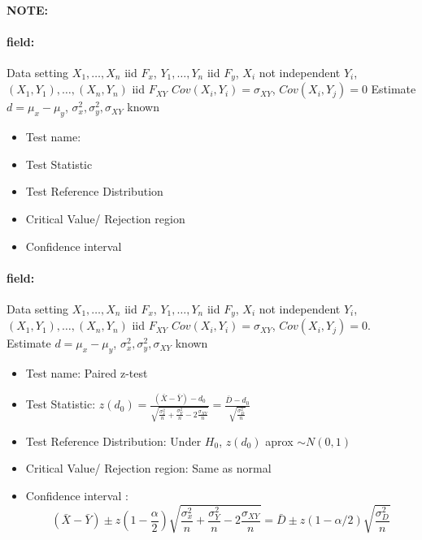 \documentclass[12pt]{article}
\newenvironment{note}{\paragraph{NOTE:}}{}
\newenvironment{field}{\paragraph{field:}}{}
\begin{document}
\begin{note}
 \begin{field}
  Data setting $X_1, \ldots , X_n$ iid $F_x$, $Y_1, \ldots, Y_n$ iid $F_y$, $X_i$ not independent $Y_i$, $(X_1, Y_1), \ldots , (X_n,Y_n)$ iid $F_{XY}$ $Cov(X_i,Y_i) = \sigma_{XY}$, $Cov(X_i,Y_j) = 0$ Estimate $d = \mu_x - \mu_y$, $\sigma_x^2, \sigma_y^2, \sigma_{XY}$ known
  \begin{itemize}
   \item Test name:
   \item Test Statistic
   \item Test Reference Distribution
   \item Critical Value/ Rejection region
   \item Confidence interval
  \end{itemize}
 \end{field}
 \begin{field}
  Data setting $X_1, \ldots , X_n$ iid $F_x$, $Y_1, \ldots, Y_n$ iid $F_y$, $X_i$ not independent $Y_i$, $(X_1, Y_1), \ldots , (X_n,Y_n)$ iid $F_{XY}$ $Cov(X_i,Y_i) = \sigma_{XY}$, $Cov(X_i,Y_j) = 0$. Estimate $d = \mu_x - \mu_y$, $\sigma_x^2, \sigma_y^2, \sigma_{XY}$ known
  \begin{itemize}
   \item Test name: Paired z-test
   \item Test Statistic: $z(d_0) = \frac{(\bar{X} - \bar{Y}) - d_0}{\sqrt{\frac{\sigma_x^2}{n} + \frac{\sigma_Y^2}{n} - 2 \frac{\sigma_{XY}}{n}}} = \frac{\bar{D} - d_0}{\sqrt{\frac{\sigma_D^2}{n}}}$
   \item Test Reference Distribution: Under $H_0$, $z(d_0) $ aprox $\sim N(0,1)$
   \item Critical Value/ Rejection region: Same as normal
   \item Confidence interval : $$(\bar{X} - \bar{Y}) \pm z(1 - \frac{\alpha}{2})\sqrt{\frac{\sigma_x^2}{n} + \frac{\sigma_Y^2}{n} - 2 \frac{\sigma_{XY}}{n}} = \bar{D} \pm z(1 - \alpha/2) \sqrt{\frac{\sigma_D^2}{n}}$$
  \end{itemize}
 \end{field}
\end{note}
\end{document}
